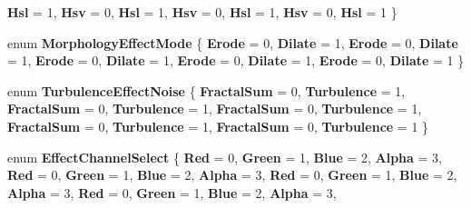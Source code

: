 \begin{DoxyCompactItemize}
{\bfseries Hsl} = 1, 
\newline
{\bfseries Hsv} = 0, 
{\bfseries Hsl} = 1, 
{\bfseries Hsv} = 0, 
{\bfseries Hsl} = 1, 
\newline
{\bfseries Hsv} = 0, 
{\bfseries Hsl} = 1
 \}
\item 
\mbox{\label{namespace_microsoft_1_1_graphics_1_1_canvas_1_1_effects_a41ef1609f91e4fdf47d735886d2d455b}} 
enum {\bfseries Morphology\+Effect\+Mode} \{ \newline
{\bfseries Erode} = 0, 
{\bfseries Dilate} = 1, 
{\bfseries Erode} = 0, 
{\bfseries Dilate} = 1, 
\newline
{\bfseries Erode} = 0, 
{\bfseries Dilate} = 1, 
{\bfseries Erode} = 0, 
{\bfseries Dilate} = 1, 
\newline
{\bfseries Erode} = 0, 
{\bfseries Dilate} = 1
 \}
\item 
\mbox{\label{namespace_microsoft_1_1_graphics_1_1_canvas_1_1_effects_a57ff6492fca7c9d4ed49c3588ec24c76}} 
enum {\bfseries Turbulence\+Effect\+Noise} \{ \newline
{\bfseries Fractal\+Sum} = 0, 
{\bfseries Turbulence} = 1, 
{\bfseries Fractal\+Sum} = 0, 
{\bfseries Turbulence} = 1, 
\newline
{\bfseries Fractal\+Sum} = 0, 
{\bfseries Turbulence} = 1, 
{\bfseries Fractal\+Sum} = 0, 
{\bfseries Turbulence} = 1, 
\newline
{\bfseries Fractal\+Sum} = 0, 
{\bfseries Turbulence} = 1
 \}
\item 
\mbox{\label{namespace_microsoft_1_1_graphics_1_1_canvas_1_1_effects_aa548de5fcafa34088d6dfff1bf77df8b}} 
enum {\bfseries Effect\+Channel\+Select} \{ \newline
{\bfseries Red} = 0, 
{\bfseries Green} = 1, 
{\bfseries Blue} = 2, 
{\bfseries Alpha} = 3, 
\newline
{\bfseries Red} = 0, 
{\bfseries Green} = 1, 
{\bfseries Blue} = 2, 
{\bfseries Alpha} = 3, 
\newline
{\bfseries Red} = 0, 
{\bfseries Green} = 1, 
{\bfseries Blue} = 2, 
{\bfseries Alpha} = 3, 
\newline
{\bfseries Red} = 0, 
{\bfseries Green} = 1, 
{\bfseries Blue} = 2, 
{\bfseries Alpha} = 3, 
\newline

\end{DoxyCompactItemize}
